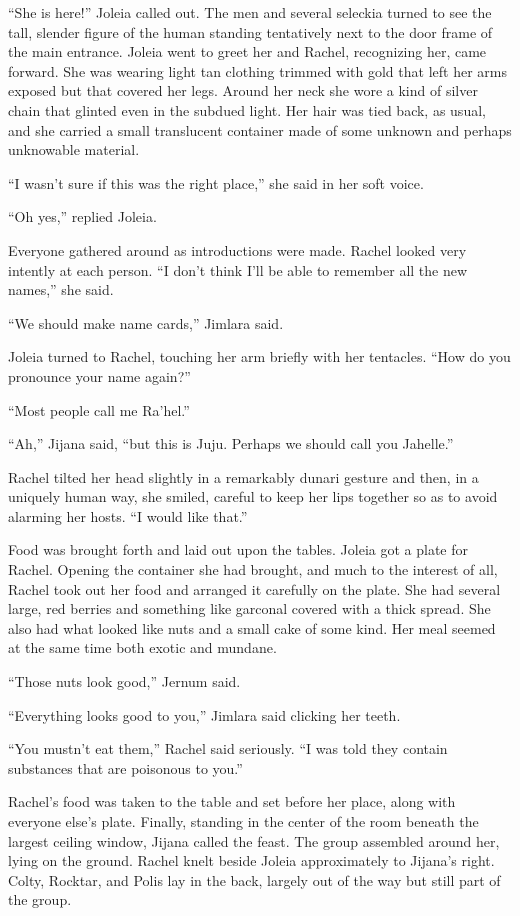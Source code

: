 ``She is here!'' Joleia called out. The men and several seleckia turned to see the tall, slender
figure of the human standing tentatively next to the door frame of the main entrance. Joleia
went to greet her and Rachel, recognizing her, came forward. She was wearing light tan clothing
trimmed with gold that left her arms exposed but that covered her legs. Around her neck she wore
a kind of silver chain that glinted even in the subdued light. Her hair was tied back, as usual,
and she carried a small translucent container made of some unknown and perhaps unknowable
material.

``I wasn't sure if this was the right place,'' she said in her soft voice.

``Oh yes,'' replied Joleia.

Everyone gathered around as introductions were made. Rachel looked very intently at each person.
``I don't think I'll be able to remember all the new names,'' she said.

``We should make name cards,'' Jimlara said.

Joleia turned to Rachel, touching her arm briefly with her tentacles. ``How do you pronounce
your name again?''

``Most people call me Ra'hel.''

``Ah,'' Jijana said, ``but this is Juju. Perhaps we should call you Jahelle.''

Rachel tilted her head slightly in a remarkably dunari gesture and then, in a uniquely human
way, she smiled, careful to keep her lips together so as to avoid alarming her hosts. ``I would
like that.''

Food was brought forth and laid out upon the tables. Joleia got a plate for Rachel. Opening the
container she had brought, and much to the interest of all, Rachel took out her food and
arranged it carefully on the plate. She had several large, red berries and something like
garconal covered with a thick spread. She also had what looked like nuts and a small cake of
some kind. Her meal seemed at the same time both exotic and mundane.

``Those nuts look good,'' Jernum said.

``Everything looks good to you,'' Jimlara said clicking her teeth.

``You mustn't eat them,'' Rachel said seriously. ``I was told they contain substances that are
poisonous to you.''

Rachel's food was taken to the table and set before her place, along with everyone else's plate.
Finally, standing in the center of the room beneath the largest ceiling window, Jijana called
the feast. The group assembled around her, lying on the ground. Rachel knelt beside Joleia
approximately to Jijana's right. Colty, Rocktar, and Polis lay in the back, largely out of the
way but still part of the group.

